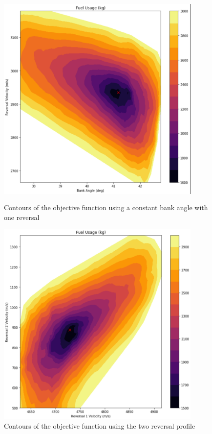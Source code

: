 \documentclass[]{article}
\begin{document}
\begin{figure}[h!]
	   \begin{minipage}{0.45\textwidth}
		\centering
		\includegraphics[width=0.9\textwidth]{Profile1_Objective} %
		\caption{Contours of the objective function using a constant bank angle with one reversal}
	\end{minipage}\hfill
	\begin{minipage}{0.45\textwidth}
		\centering
		\includegraphics[width=0.9\textwidth]{Profile2_Objective} %
		\caption{Contours of the objective function using the two reversal profile}
	\end{minipage}
\end{figure}
\end{document}
